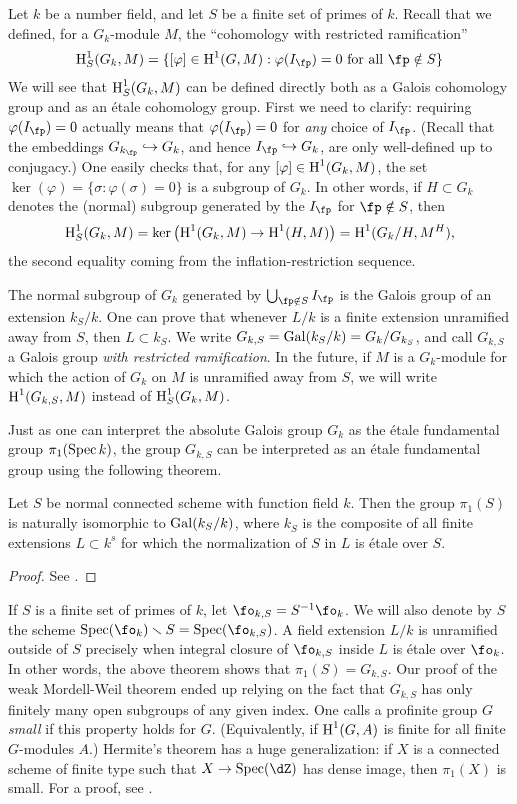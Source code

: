 \documentclass{article}
\begin{document}
Let $k$ be a number field, and let $S$ be a finite set of primes of $k$. Recall 
that we defined, for a $G_k$-module $M$, the ``cohomology with restricted 
ramification'' 
\[
  \h_S^1(G_k,M) = \{[\varphi]\in \h^1(G,M) : \varphi(I_\fp) = 0\text{ for all }\fp\notin S\}
\]
We will see that $\operatorname{H}_S^1(G_k,M)$ can be defined directly both as a Galois 
cohomology group and as an \'etale cohomology group. First we need to clarify: 
requiring $\varphi(I_\fp)=0$ actually means that $\varphi(I_\fp)=0$ for 
\emph{any} choice of $I_\fp$. (Recall that the embeddings 
$G_{k_\fp}\hookrightarrow G_k$, and hence $I_\fp\hookrightarrow G_k$, are only 
well-defined up to conjugacy.) One easily checks that, for any 
$[\varphi]\in \operatorname{H}^1(G_k,M)$, the set 
$\ker(\varphi)=\{\sigma:\varphi(\sigma)=0\}$ is a subgroup of $G_k$. In other 
words, if $H\subset G_k$ denotes the (normal) subgroup generated by the 
$I_\fp$ for $\fp\notin S$, then 
\[
  \operatorname{H}_S^1(G_k,M) = \ker\left(\operatorname{H}^1(G_k,M) \to \operatorname{H}^1(H,M)\right) 
                = \operatorname{H}^1(G_k/H,M^H) \text{,}
\]
the second equality coming from the inflation-restriction sequence. 

The normal subgroup of $G_k$ generated by $\bigcup_{\fp\notin S} I_\fp$ is the 
Galois group of an extension $k_S/k$. One can prove that whenever $L/k$ is a 
finite extension unramified away from $S$, then $L\subset k_S$. We write 
$G_{k,S}=\operatorname{Gal}(k_S/k) = G_k/G_{k_S}$, and call $G_{k,S}$ a Galois 
group \emph{with restricted ramification}. In the future, if $M$ is a 
$G_k$-module for which the action of $G_k$ on $M$ is unramified away from 
$S$, we will write $\operatorname{H}^1(G_{k,S},M)$ instead of $\operatorname{H}_S^1(G_k,M)$. 

Just as one can interpret the 
absolute Galois group $G_k$ as the \'etale fundamental group 
$\pi_1(\operatorname{Spec} k)$, the group $G_{k,S}$ can be interpreted as an \'etale 
fundamental group using the following theorem.

\begin{theorem}
Let $S$ be normal connected scheme with function field $k$. Then the group 
$\pi_1(S)$ is naturally isomorphic to $\operatorname{Gal}(k_S/k)$, where $k_S$ is the 
composite of all finite extensions $L\subset k^s$ for which the normalization 
of $S$ in $L$ is \'etale over $S$. 
\end{theorem}
\begin{proof}
See \cite[5.4.9]{sz09}.
\end{proof}

If $S$ is a finite set of primes of $k$, let $\fo_{k,S}=S^{-1}\fo_k$. We will 
also denote by $S$ the scheme $\spec(\fo_k)\smallsetminus S=\spec(\fo_{k,S})$. A 
field extension $L/k$ is unramified outside of $S$ precisely when integral 
closure of $\fo_{k,S}$ inside $L$ is \'etale over $\fo_k$. In other words, the 
above theorem shows that $\pi_1(S)=G_{k,S}$. Our proof of the weak Mordell-Weil 
theorem ended up relying on the fact that $G_{k,S}$ has only finitely many open 
subgroups of any given index. One calls a profinite group $G$ \emph{small} if 
this property holds for $G$. (Equivalently, if $\operatorname{H}^1(G,A)$ is finite for all 
finite $G$-modules $A$.) Hermite's theorem has a huge generalization: if $X$ is 
a connected scheme of finite type such that $X\to \spec(\dZ)$ has dense image, 
then $\pi_1(X)$ is small. For a proof, see \cite[2.8]{hh09}. 
\end{document}
